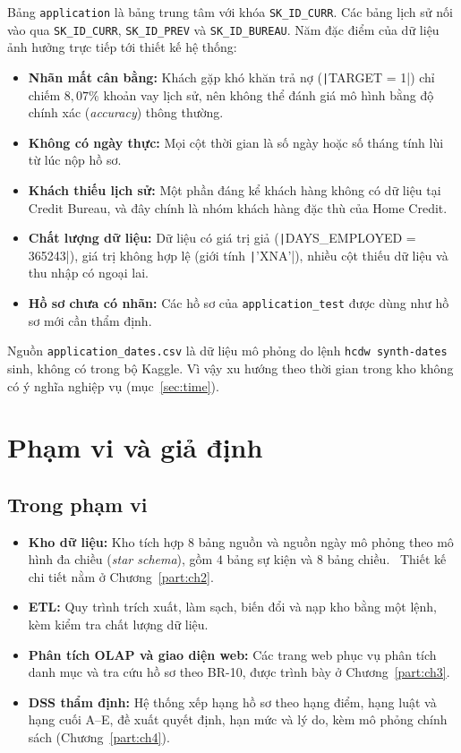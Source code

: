 Bảng \texttt{application} là bảng trung tâm với khóa \texttt{SK\_ID\_CURR}. Các bảng lịch sử nối vào qua \texttt{SK\_ID\_CURR}, \texttt{SK\_ID\_PREV} và \texttt{SK\_ID\_BUREAU}. Năm đặc điểm của dữ liệu ảnh hưởng trực tiếp tới thiết kế hệ thống:
\begin{itemize}[topsep=0pt, itemsep=1pt]
	\item \textbf{Nhãn mất cân bằng:} Khách gặp khó khăn trả nợ (\texttt|TARGET = 1|) chỉ chiếm $8{,}07\%$ khoản vay lịch sử, nên không thể đánh giá mô hình bằng độ chính xác (\textit{accuracy}) thông thường.
	\item \textbf{Không có ngày thực:} Mọi cột thời gian là số ngày hoặc số tháng tính lùi từ lúc nộp hồ sơ.
	\item \textbf{Khách thiếu lịch sử:} Một phần đáng kể khách hàng không có dữ liệu tại Credit Bureau, và đây chính là nhóm khách hàng đặc thù của Home Credit.
	\item \textbf{Chất lượng dữ liệu:} Dữ liệu có giá trị giả (\texttt|DAYS_EMPLOYED = 365243|), giá trị không hợp lệ (giới tính \texttt|'XNA'|), nhiều cột thiếu dữ liệu và thu nhập có ngoại lai.
	\item \textbf{Hồ sơ chưa có nhãn:} Các hồ sơ của \texttt{application\_test} được dùng như hồ sơ mới cần thẩm định.
\end{itemize}

\medskip

Nguồn \texttt{application\_dates.csv} là dữ liệu mô phỏng do lệnh \texttt{hcdw synth-dates} sinh, không có trong bộ Kaggle. Vì vậy xu hướng theo thời gian trong kho không có ý nghĩa nghiệp vụ (mục~\ref{sec:time}).

\section{Phạm vi và giả định}
\label{sec:scope}

\subsection*{Trong phạm vi}
\label{sec:in-scope}
\begin{itemize}[topsep=0pt, itemsep=1pt]
	\item \textbf{Kho dữ liệu:} Kho tích hợp $8$ bảng nguồn và nguồn ngày mô phỏng theo mô hình đa chiều (\textit{star schema}), gồm $4$ bảng sự kiện và $8$ bảng chiều.~\cite{kimball2013} Thiết kế chi tiết nằm ở Chương~\ref{part:ch2}.
	\item \textbf{ETL:} Quy trình trích xuất, làm sạch, biến đổi và nạp kho bằng một lệnh, kèm kiểm tra chất lượng dữ liệu.
	\item \textbf{Phân tích OLAP và giao diện web:} Các trang web phục vụ phân tích danh mục và tra cứu hồ sơ theo BR-10, được trình bày ở Chương~\ref{part:ch3}.
	\item \textbf{DSS thẩm định:} Hệ thống xếp hạng hồ sơ theo hạng điểm, hạng luật và hạng cuối A--E, đề xuất quyết định, hạn mức và lý do, kèm mô phỏng chính sách (Chương~\ref{part:ch4}).
\end{itemize}

